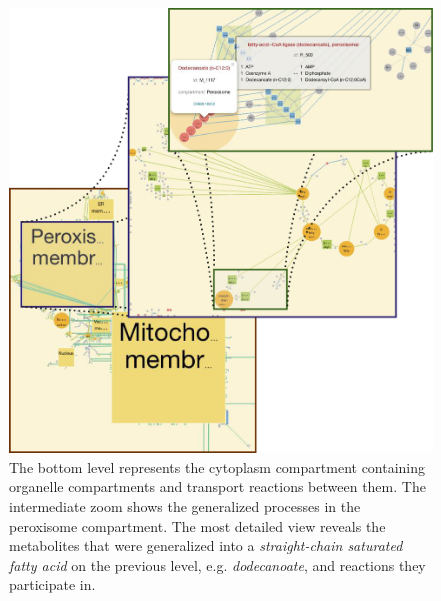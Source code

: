 \documentclass{bmcart}
\begin{document}
\begin{backmatter}
  \begin{figure}[h!]
 \includegraphics[scale=0.5]{figure1.png}
  \caption{
  \label{fig:zoom_levels}
      The bottom level represents the cytoplasm compartment containing organelle compartments and transport reactions between them. The intermediate zoom shows the generalized processes in the peroxisome compartment. The most detailed view reveals the metabolites that were generalized into a \emph{straight-chain saturated fatty acid} on the previous level, e.g. \textit{dodecanoate}, and reactions they participate in.}
      \end{figure}




\end{backmatter}
\end{document}
